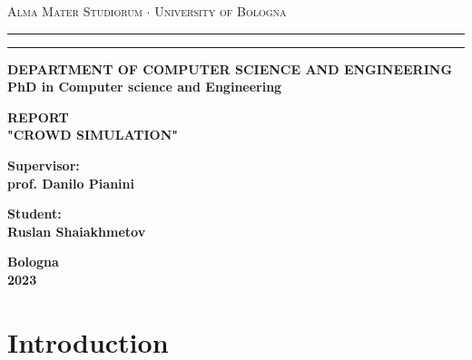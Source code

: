 \documentclass[12pt,a4paper]{report}
\begin{document}
\begin{titlepage}
\begin{center}
{{\Large{\textsc{Alma Mater Studiorum $\cdot$ University of
Bologna}}}} \rule[0.1cm]{15.8cm}{0.1mm}
\rule[0.5cm]{15.8cm}{0.6mm}
{\small{\bf DEPARTMENT OF COMPUTER SCIENCE AND ENGINEERING\\
PhD in Computer science and Engineering }}
\end{center}
\vspace{15mm}
\begin{center}
{\LARGE{\bf REPORT}}\\
\vspace{3mm}
{\LARGE{\bf "CROWD SIMULATION"}}\\
\vspace{3mm}
\end{center}
\vspace{40mm}
\par
\noindent
\begin{minipage}[t]{0.47\textwidth}
{\large{\bf Supervisor:\\
prof. Danilo Pianini}}
\end{minipage}
\hfill
\begin{minipage}[t]{0.47\textwidth}\raggedleft
{\large{\bf Student:\\
Ruslan Shaiakhmetov}}
\end{minipage}
\vspace{60mm}
\begin{center}
{\large{\bf Bologna \\ 2023 }}%
\end{center}
\end{titlepage}
\chapter*{Introduction}
\end{document}
